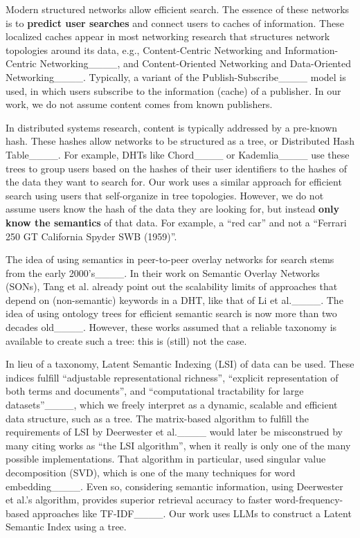 Modern structured networks allow efficient search.
The essence of these networks is to \textbf{predict user searches} and connect users to caches of information.
These localized caches appear in most networking research that structures network topologies around its data, e.g., Content-Centric Networking and Information-Centric Networking____, and Content-Oriented Networking and Data-Oriented Networking____.
Typically, a variant of the Publish-Subscribe____ model is used, in which users subscribe to the information (cache) of a publisher.
In our work, we do not assume content comes from known publishers.

In distributed systems research, content is typically addressed by a pre-known hash.
These hashes allow networks to be structured as a tree, or Distributed Hash Table____.
For example, DHTs like Chord____ or Kademlia____ use these trees to group users based on the hashes of their user identifiers to the hashes of the data they want to search for.
Our work uses a similar approach for efficient search using users that self-organize in tree topologies.
However, we do not assume users know the hash of the data they are looking for, but instead \textbf{only know the semantics} of that data.
For example, a ``red car'' and not a ``Ferrari 250 GT California Spyder SWB (1959)''.

The idea of using semantics in peer-to-peer overlay networks for search stems from the early 2000's____.
In their work on Semantic Overlay Networks (SONs), Tang et al. already point out the scalability limits of approaches that depend on (non-semantic) keywords in a DHT, like that of Li et al.____.
The idea of using ontology trees for efficient semantic search is now more than two decades old____.
However, these works assumed that a reliable taxonomy is available to create such a tree: this is (still) not the case.

In lieu of a taxonomy, Latent Semantic Indexing (LSI) of data can be used.
These indices fulfill ``adjustable representational richness'', ``explicit representation of both terms and documents'', and ``computational tractability for large datasets''____, which we freely interpret as a dynamic, scalable and efficient data structure, such as a tree.
The matrix-based algorithm to fulfill the requirements of LSI by Deerwester et al.____ would later be misconstrued by many citing works as ``the LSI algorithm'', when it really is only one of the many possible implementations.
That algorithm in particular, used singular value decomposition (SVD), which is one of the many techniques for word embedding____.
Even so, considering semantic information, using Deerwester et al.'s algorithm, provides superior retrieval accuracy to faster word-frequency-based approaches like TF-IDF____. 
Our work uses LLMs to construct a Latent Semantic Index using a tree.

